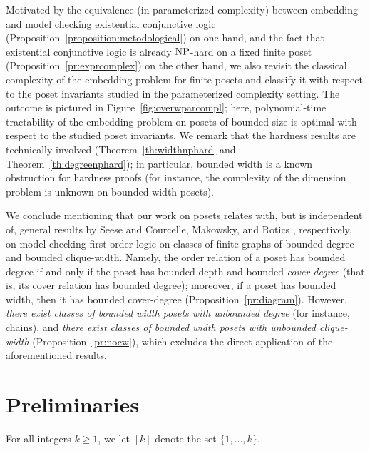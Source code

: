 \documentclass[usletter]{article}
\newcommand{\shortversion}[1]{}
\begin{document}
Motivated by the equivalence (in parameterized complexity) between embedding and model checking existential conjunctive logic 
(Proposition~\ref{proposition:metodological}) on one hand, 
and the fact that existential conjunctive logic is already $\textup{NP}$-hard on a fixed finite poset (Proposition~\ref{pr:exprcomplex}) on the other hand, 
we also revisit the classical complexity of the embedding problem for finite posets and classify 
it with respect to the poset invariants studied in the parameterized complexity setting.  
The outcome is pictured in Figure~\ref{fig:overwparcompl}; here, polynomial-time tractability 
of the embedding problem on posets of bounded size is optimal with respect to the studied poset 
invariants.  We remark that the hardness results are technically involved (Theorem~\ref{th:widthnphard} and Theorem~\ref{th:degreenphard}); 
in particular, bounded width is a known obstruction for hardness proofs 
(for instance, the complexity of the dimension problem is unknown on bounded width posets).

We conclude mentioning that our work on posets relates with, but is independent of, 
general results by Seese \cite{Seese96} and Courcelle, Makowsky, and Rotics \cite{CourcelleMakowskyRotics00}, respectively, on model checking first-order logic 
on classes of finite graphs of bounded degree and bounded clique-width.  Namely, the order relation of a poset has bounded degree 
if and only if the poset has bounded depth and bounded \emph{cover-degree} (that is, its cover relation has bounded degree); 
moreover, if a poset has bounded width, then it has bounded cover-degree (Proposition~\ref{pr:diagram}).  
However, \emph{there exist classes of bounded width posets with unbounded degree} (for instance, chains), 
and \emph{there exist classes of bounded width posets with unbounded clique-width} (Proposition~\ref{pr:nocw}), 
which excludes the direct application of the aforementioned results.

\medskip

\noindent \shortversion{\emph{Throughout the paper, we mark with $\star$ all statements whose proofs 
are omitted; we refer to the \href{http://arxiv.org/abs/???}{arXiv} for a full version.}}


\section{Preliminaries}\label{sect:prelim}

For all integers $k \geq 1$, we let $[k]$ denote the set $\{ 1, \ldots, k \}$.
\end{document}
